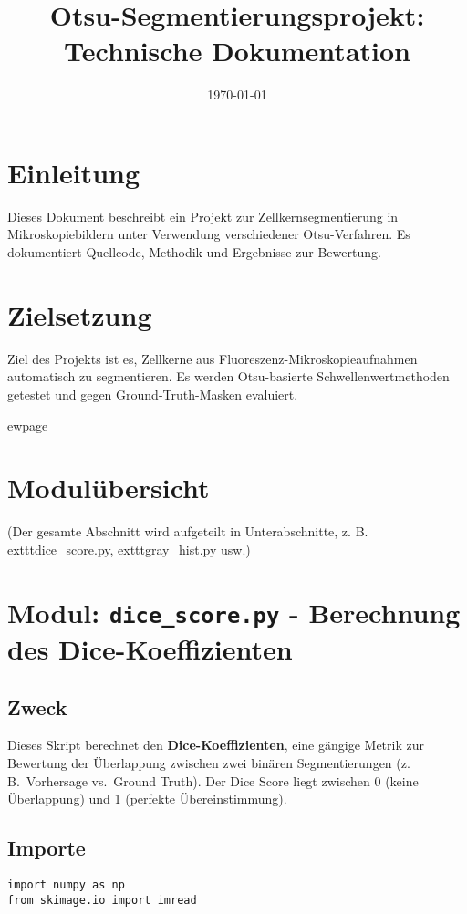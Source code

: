 \documentclass[a4paper,12pt]{article}
\title{Otsu-Segmentierungsprojekt: Technische Dokumentation}
\author{}
\date{\today}
\begin{document}
\maketitle

\tableofcontents

\newpage

\section{Einleitung}
Dieses Dokument beschreibt ein Projekt zur Zellkernsegmentierung in Mikroskopiebildern unter Verwendung verschiedener Otsu-Verfahren. Es dokumentiert Quellcode, Methodik und Ergebnisse zur Bewertung.

\newpage


\newpage

\section{Zielsetzung}
Ziel des Projekts ist es, Zellkerne aus Fluoreszenz-Mikroskopieaufnahmen automatisch zu segmentieren. Es werden Otsu-basierte Schwellenwertmethoden getestet und gegen Ground-Truth-Masken evaluiert.


ewpage

\section{Modulübersicht}
(Der gesamte Abschnitt wird aufgeteilt in Unterabschnitte, z. B. 	exttt{dice\_score.py}, 	exttt{gray\_hist.py} usw.)

\section{Modul: \texttt{dice\_score.py} - Berechnung des Dice-Koeffizienten}

\subsection*{Zweck}
Dieses Skript berechnet den \textbf{Dice-Koeffizienten}, eine gängige Metrik zur Bewertung der Überlappung zwischen zwei binären Segmentierungen (z.\,B.\ Vorhersage vs.\ Ground Truth). Der Dice Score liegt zwischen 0 (keine Überlappung) und 1 (perfekte Übereinstimmung).

\subsection*{Importe}
\begin{verbatim}
import numpy as np
from skimage.io import imread
\end{verbatim}
\end{document}
